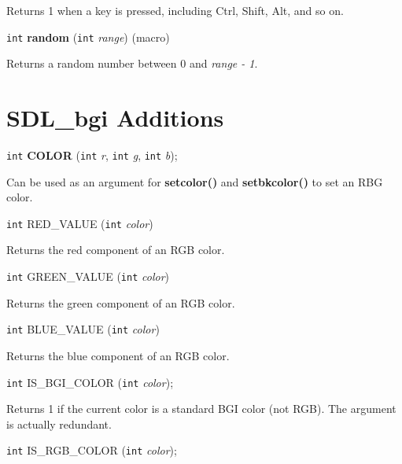 \documentclass[a4paper,11pt]{article}
\newcommand{\SDLbgi}{SDL\_bgi}
\newcommand{\I}{\texttt{int}}       %
\newcommand{\func}[1]{\textbf{#1}}  %
\newcommand{\A}[1]{\emph{#1}}       %
\newenvironment{bgi}
{ %
  \begin{snugshade}
}
{ %
  \end{snugshade}
}
\begin{document}
Returns 1 when a key is pressed, including Ctrl, Shift, Alt, and so
on.


\begin{bgi}
\I{} \func{random} (\I{} \A{range}) (macro)
\end{bgi}

Returns a random number between 0 and \A{range - 1}.

	
\section{\SDLbgi{} Additions}

\begin{bgi}
\I{} \func{COLOR} (\I{} \A{r}, \I{} \A{g}, \I{} \A{b});
\end{bgi}

Can be used as an argument for \func{setcolor()} and
\func{setbkcolor()} to set an RBG color.


\begin{bgi}
\I{} RED\_VALUE (\I{} \A{color})
\end{bgi}

Returns the red component of an RGB color.


\begin{bgi}
\I{} GREEN\_VALUE (\I{} \A{color})
\end{bgi}

Returns the green component of an RGB color.


\begin{bgi}
\I{} BLUE\_VALUE (\I{} \A{color})
\end{bgi}

Returns the blue component of an RGB color.


\begin{bgi}
\I{} IS\_BGI\_COLOR (\I{} \A{color});
\end{bgi}

Returns 1 if the current color is a standard BGI color (not RGB). The
argument is actually redundant.


\begin{bgi}
\I{} IS\_RGB\_COLOR (\I{} \A{color});
\end{bgi}
\end{document}
